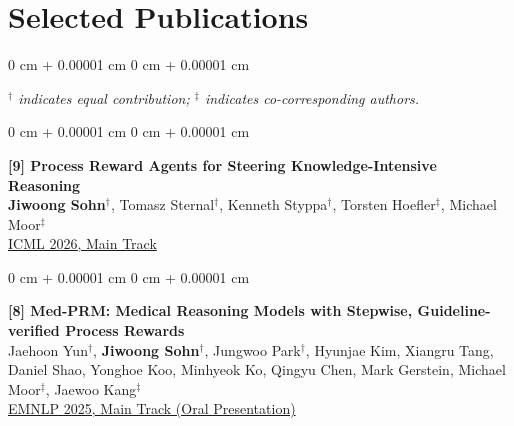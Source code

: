 \documentclass[11pt, letterpaper]{article}
\newenvironment{highlights}{
    \begin{itemize}[
        topsep=0.10 cm,
        parsep=0.10 cm,
        partopsep=0pt,
        itemsep=0pt,
        leftmargin=0 cm + 10pt
    ]
}{
    \end{itemize}
} %
\newenvironment{onecolentry}{
    \Needspace{3\baselineskip}
    \begin{adjustwidth}{
        0 cm + 0.00001 cm
    }{
        0 cm + 0.00001 cm
    }
}{
    \end{adjustwidth}
} %
\begin{document}
\vspace{0.2 cm}
\section{Selected Publications}

\begin{onecolentry}
    {\footnotesize\textit{$^{\dagger}$ indicates equal contribution; $^{\ddagger}$ indicates co-corresponding authors.}}
\end{onecolentry}
\vspace{0.2 cm}

\begin{onecolentry}
    \textbf{[9] Process Reward Agents for Steering Knowledge-Intensive Reasoning} \\
    \textbf{Jiwoong Sohn$^{\dagger}$}, Tomasz Sternal$^{\dagger}$, Kenneth Styppa$^{\dagger}$, Torsten Hoefler$^{\ddagger}$, Michael Moor$^{\ddagger}$ \\
    \href{https://arxiv.org/abs/2604.09482}{{ICML 2026, Main Track}} \\
\end{onecolentry}
\vspace{0.3 cm}

\begin{onecolentry}
    \textbf{[8] Med-PRM: Medical Reasoning Models with Stepwise, Guideline-verified Process Rewards} \\
    Jaehoon Yun$^{\dagger}$, \textbf{Jiwoong Sohn$^{\dagger}$}, Jungwoo Park$^{\dagger}$, Hyunjae Kim, Xiangru Tang, Daniel Shao, Yonghoe Koo, Minhyeok Ko, Qingyu Chen, Mark Gerstein, Michael Moor$^{\ddagger}$, Jaewoo Kang$^{\ddagger}$ \\
    \href{https://arxiv.org/abs/2506.11474}{{EMNLP 2025, Main Track (Oral Presentation)}} \\
\end{onecolentry}
\vspace{0.3 cm}
\end{document}
